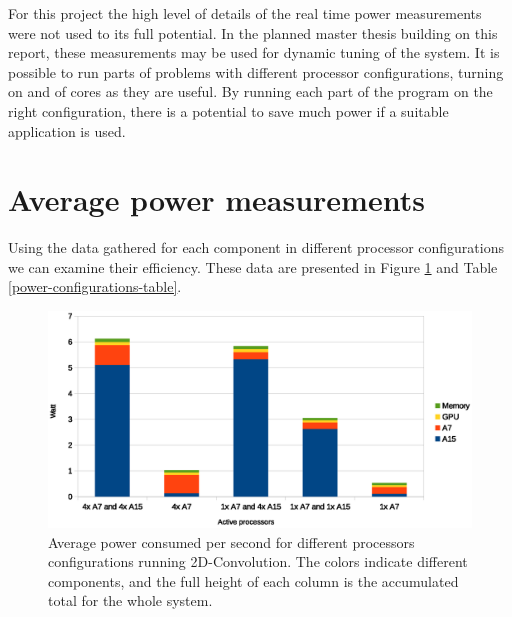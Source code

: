 For this project the high level of details of the real time power measurements were not used to its full potential.
In the planned master thesis building on this report, these measurements may be used for dynamic tuning of the system.
It is possible to run parts of problems with different processor configurations, turning on and of cores as they are useful.
By running each part of the program on the right configuration, there is a potential to save much power if a suitable application is used.

\section{Average power measurements}
Using the data gathered for each component in different processor configurations we can examine their efficiency.
These data are presented in Figure \ref{power-configurations} and Table \ref{power-configurations-table}.
\begin{figure}[H]
  \centering
  \includegraphics[width=160mm]{fig/power-configurations.eps}
  \caption{Average power consumed per second for different processors configurations running 2D-Convolution. The colors indicate different components, and the full height of each column is the accumulated total for the whole system.\label{overflow}} \label{power-configurations}
\end{figure}

